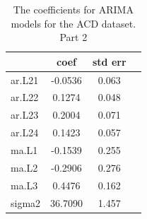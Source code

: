 \documentclass[12pt,a4paper]{article}
\theoremstyle{myplain}
\numberwithin{equation}{section}
\begin{document}
\begin{table}[h!]
\label{tab:table6}
\begin{center}
\begin{tabular}{|l|c|c|c|}
\hline
 & coef  &  std err \\
\hline
ar.L21    &    -0.0536     & 0.063 \\
\hline
ar.L22    &     0.1274     & 0.048 \\
\hline
ar.L23    &     0.2004    &  0.071 \\
\hline
ar.L24    &     0.1423   &   0.057 \\
\hline
ma.L1     &    -0.1539     & 0.255 \\
\hline
ma.L2     &    -0.2906    &  0.276 \\
\hline
ma.L3     &     0.4476   &   0.162 \\
\hline
sigma2    &    36.7090  &    1.457 \\
\hline
\end{tabular}
\end{center}
\caption{The coefficients for ARIMA models for the ACD dataset. Part 2}
\end{table}

\newpage
\end{document}
